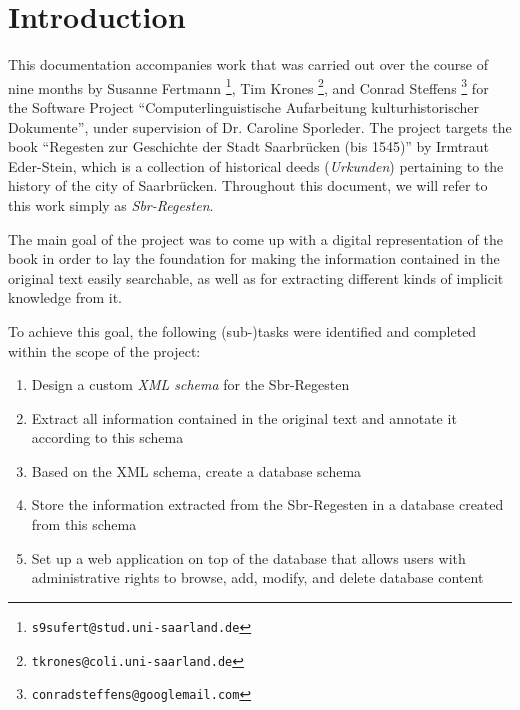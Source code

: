 \section{Introduction}
\label{sec:intro}

This documentation accompanies work that was carried out over the
course of nine months by Susanne Fertmann
\footnote{\texttt{s9sufert@stud.uni-saarland.de}}, Tim Krones
\footnote{\texttt{tkrones@coli.uni-saarland.de}}, and Conrad Steffens
\footnote{\texttt{conradsteffens@googlemail.com}} for the Software
Project ``Computerlinguistische Aufarbeitung kulturhistorischer
Dokumente'', under supervision of Dr. Caroline Sporleder. The project
targets the book ``Regesten zur Geschichte der Stadt Saarbrücken (bis
1545)'' by Irmtraut Eder-Stein, which is a collection of historical
deeds (\emph{Urkunden}) pertaining to the history of the city of
Saarbrücken. Throughout this document, we will refer to this work
simply as \emph{Sbr-Regesten}.

The main goal of the project was to come up with a digital
representation of the book in order to lay the foundation for making
the information contained in the original text easily searchable, as
well as for extracting different kinds of implicit knowledge from it.

To achieve this goal, the following (sub-)tasks were identified and
completed within the scope of the project:

\begin{enumerate}
\item Design a custom \emph{XML schema} for the Sbr-Regesten
\item Extract all information contained in the original text and
  annotate it according to this schema
\item Based on the XML schema, create a database schema
\item Store the information extracted from the Sbr-Regesten in a
  database created from this schema
\item Set up a web application on top of the database that allows
  users with administrative rights to browse, add, modify, and delete
  database content
\end{enumerate}

